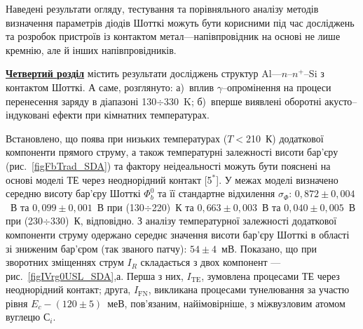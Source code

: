 Наведені результати огляду, тестування та порівняльного аналізу методів визначення параметрів
діодів Шотткі можуть бути корисними під час досліджень та
розробок пристроїв із контактом метал---напівпровідник на основі не лише кремнію, але й інших напівпровідників.


\underline{\textbf{Четвертий розділ}} містить результати досліджень структур Al---$n$--$n^+$--Si з контактом Шотткі.
А саме, розглянуто:
а)~вплив $\gamma$--опромінення на процеси перенесення заряду в діапазоні 130$\div$330~K;
б)~вперше виявлені оборотні акусто--індуковані ефекти при кімнатних температурах.
%

Встановлено, що поява при низьких температурах ($T\!<$210~К) додаткової компоненти прямого струму,
а також температурні залежності висоти бар'єру (рис.~\ref{figFbTrad_SDA}) та фактору неідеальності можуть бути пояснені
на основі моделі ТЕ через неоднорідний контакт
[5$^*$].
%
       У межах моделі визначено середню висоту бар'єру Шотткі $\Phi_b^0$ та її стандартне відхилення $\sigma_{\Phi}$:
       $0,872\pm0,004$~В та $0,099\pm0,001$~В при (130$\div$220)~К та
       $0,663\pm0,003$~В та $0,040\pm0,005$~В при (230$\div$330)~К, відповідно.
З аналізу температурної залежності додаткової компоненти струму одержано середнє значення висоти бар'єру Шотткі в області зі зниженим бар'єром (так званого патчу): $54\pm4$~мВ.
Показано, що при зворотних зміщеннях струм $I_R$ складається з двох компонент --- рис.~\ref{figIVrg0USL_SDA},а.
Перша з них, $I_\mathrm{TE}$, зумовлена процесами ТЕ через неоднорідний контакт;
друга,
$I_\mathrm{FN}$, викликана процесами тунелювання за участю
рівня $E_c-(120\pm5)$~меВ, пов'язаним, найімовірніше, з міжвузловим атомом вуглецю С$_i$.

